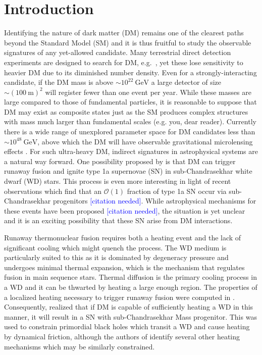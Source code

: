 \documentclass[twocolumn, preprintnumbers,amsmath,amssymb,prd, superscriptaddress]{revtex4}
\newcommand{\OO}{\mathcal{O}}
\newcommand{\GeV}{\text{GeV}}
\begin{document}
\section{Introduction}
\label{sec:Introduction}

Identifying the nature of dark matter (DM) remains one of the clearest paths beyond the Standard Model (SM) and it is thus fruitful to study the observable signatures of any yet-allowed candidate.
Many terrestrial direct detection experiments are designed to search for DM, e.g.~\cite{Akerib:2016vxi, Agnese:2017njq}, yet these lose sensitivity to heavier DM due to its diminished number density.
Even for a strongly-interacting candidate, if the DM mass is above $\sim 10^{22} ~\GeV$ a large detector of size $\sim (100 ~\text{m})^2$ will register fewer than one event per year.
While these masses are large compared to those of fundamental particles, it is reasonable to suppose that DM may exist as composite states just as the SM produces complex structures with mass much larger than fundamental scales (e.g. you, dear reader).
Currently there is a wide range of unexplored parameter space for DM candidates less than $\sim 10^{48} ~\GeV$, above which the DM will have observable gravitational microlensing effects \cite{Griest:2013aaa}.
For such ultra-heavy DM, indirect signatures in astrophysical systems are a natural way forward.
One possibility proposed by \cite{Graham:2015apa} is that DM can trigger runaway fusion and ignite type 1a supernovae (SN) in sub-Chandrasekhar white dwarf (WD) stars.
This process is even more interesting in light of recent observations which find that an $\OO(1)$ fraction of type 1a SN occur via sub-Chandrasekhar progenitors \textcolor{blue}{[citation needed]}.
While astrophysical mechanisms for these events have been proposed \textcolor{blue}{[citation needed]}, the situation is yet unclear and it is an exciting possibility that these SN arise from DM interactions.

Runaway thermonuclear fusion requires both a heating event and the lack of significant cooling which might quench the process.
The WD medium is particularly suited to this as it is dominated by degeneracy pressure and undergoes minimal thermal expansion, which is the mechanism that regulates fusion in main sequence stars.
Thermal diffusion is the primary cooling process in a WD and it can be thwarted by heating a large enough region.
The properties of a localized heating necessary to trigger runaway fusion were computed in \cite{Woosley}.
Consequently, \cite{Graham:2015apa} realized that if DM is capable of sufficiently heating a WD in this manner, it will result in a SN with sub-Chandrasekhar Mass progenitor.
This was used to constrain primordial black holes which transit a WD and cause heating by dynamical friction, although the authors of \cite{Graham:2015apa} identify several other heating mechanisms which may be similarly constrained.
\end{document}
